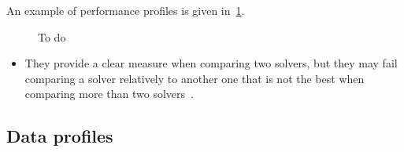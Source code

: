 An example of performance profiles is given in~\cref{fig:performance-profile-example}.

\begin{figure}[ht]
    \centering
    \caption{To do}
    \label{fig:performance-profile-example}
\end{figure}

\begin{itemize}
    \item They provide a clear measure when comparing two solvers, but they may fail comparing a solver relatively to another one that is not the best when comparing more than two solvers~\cite{Gould_Scott_2016}.
\end{itemize}

\subsection{Data profiles}
